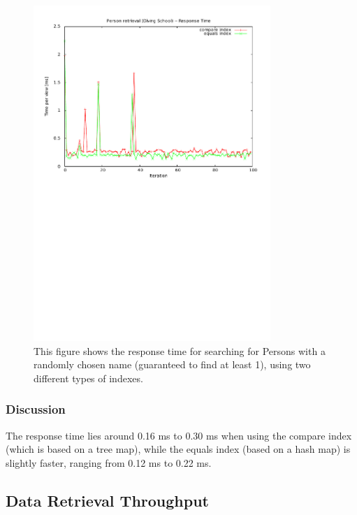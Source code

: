 \begin{figure}[h!]
\centering
\includegraphics[width = 0.8\textwidth, trim = 0 15cm 0 1cm]{img/retrievalDvuResponse.pdf}
\caption{This figure shows the response time for searching for Persons with a randomly chosen name (guaranteed to find at least 1), using two different types of indexes.}
\label{fig:retrievalDvuResponse}
\end{figure}


\subsubsection{Discussion}

The response time lies around 0.16 ms to 0.30 ms when using the compare
index (which is based on a tree map), while the equals index (based
on a hash map) is slightly faster, ranging from 0.12 ms to 0.22 ms.


\subsection{Data Retrieval Throughput}

